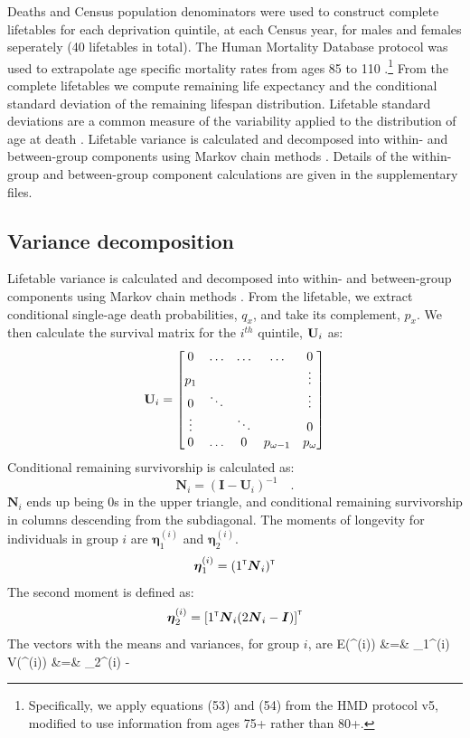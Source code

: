 \documentclass[12pt,oneside,a4paper]{article} %
\theoremstyle{definition}
\begin{document}
Deaths and Census population denominators were used to construct complete
lifetables for each deprivation quintile, at each Census year, for males and
females seperately (40 lifetables in total). The Human Mortality Database
protocol was used to extrapolate age specific mortality rates from ages 85 to
110 \citep{Wilmoth2007}.\footnote{Specifically, we apply equations (53) and
(54) from the HMD protocol v5, modified to use information from ages 75+
rather than 80+.} From the complete lifetables we compute remaining
life expectancy and the conditional standard deviation of the remaining lifespan
distribution. Lifetable standard deviations are a common measure of the
variability applied to the distribution of age at death \citep{Raalte2013}. Lifetable variance is calculated and decomposed into within- and between-group
components using Markov chain methods \citep{Caswell2001}\citep{Caswell2009}\citep{Caswell2014}. Details of the within-group and between-group component calculations are given in the supplementary files.


\subsection{Variance decomposition}
Lifetable variance is calculated and decomposed into within- and between-group
components using Markov chain methods \citep{Caswell2001}\citep{Caswell2009}\citep{Caswell2014}. From the lifetable, we extract
conditional single-age death probabilities, $q_x$, and take its complement,
$p_x$. We then calculate the survival matrix for the $i^{th}$
quintile, ${\bf U}_i$ as:
\begin{equation}
{\bf U}_i = 
\begin{bmatrix}
    0     & \hdots  & \hdots &  \hdots  & 0 \\
    p_{1} &   &    &    &  \vdots \\
    0 & \ddots &   &   & \vdots \\
    \vdots & & \ddots & & 0\\
   0 &  \hdots & 0 & p_{\omega-1}  & p_{\omega}
\end{bmatrix}
\end{equation}
Conditional remaining survivorship is calculated as:
\begin{equation}
\mathbf{N}_i = (\mathbf{I} - \mathbf{U}_i )^{-1} \quad .
\end{equation}
$\mathbf{N}_i$ ends up being 0s in the upper triangle, and conditional remaining
survivorship in columns descending from the subdiagonal. The moments of longevity for individuals in group $i$ are $\bm \eta_1^{(i)}$ and $\bm \eta_2^{(i)}$. 
\begin{equation}
\mbox{\boldmath $\eta$}_1^{(i)} = (1^{\mbox{\tiny \sf T}} \mbox{\boldmath $N$}_i)^{\mbox{\tiny \sf T}}
\end{equation}
The second moment is defined as:
\begin{equation}
\mbox{\boldmath $\eta$}_2^{(i)} = \left[ 1^{\mbox{\tiny \sf T}} \mbox{\boldmath $N$}_i (2 \mbox{\boldmath $N$}_i - \mbox{\boldmath $I$})\right]^{\mbox{\tiny \sf T}}
\end{equation}
The vectors with the means and variances, for group $i$, are
\bea
E(\bm \eta^{(i)}) &=& \bm \eta_1^{(i)} \\
V(\bm \eta^{(i)}) &=& \bm \eta_2^{(i)} - 
\eea
\end{document}
